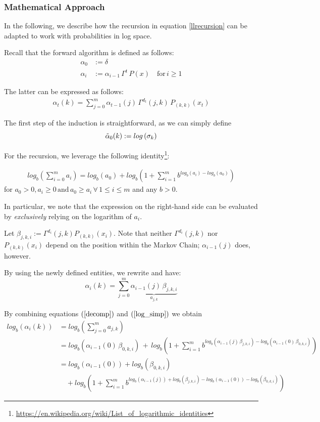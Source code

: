 \subsubsection{Mathematical Approach}
In the following, we describe how the recursion in equation \ref{llrecursion} can be adapted to work with probabilities in log space.  

Recall that the forward algorithm is defined as follows:
\begin{align*}
\alpha_0 &:= \delta \\
\alpha_i &:= \alpha_{i-1} \, \Gamma^t \, P(x) \quad \text{for}\, i \geq 1
\end{align*}

The latter can be expressed as follows:
\begin{align*}
\alpha_t(k) = \sum_{j=0}^m \alpha_{t-1}(j) \, \Gamma^{d_t}(j,k) \, P_{(k, k)}(x_t)
\end{align*}

The first step of the induction is straightforward, as we can simply define
\[
\tilde{\alpha}_{0}(k) := log\left(\sigma_k\right)
\]

For the recursion, we leverage the following identity\footnote{\url{https://en.wikipedia.org/wiki/List_of_logarithmic_identities}}:

\begin{align}
log_b\left( \sum_{i=0}^m a_i \right) = 
log_b(a_0) + log_b\left(1 + \sum_{i=1}^m b^{log_b(a_i) - log_b(a_0)}\right)
\label{log_simp}
\end{align}
for $a_0 > 0, a_i \geq 0 \, \text{and} \, a_0 \geq a_i \, \forall \, 1 \leq i \leq m$  and any $b > 0$.  

In particular, we note that the expression on the right-hand side can be evaluated by \textit{exclusively} relying on the logarithm of $a_i$. 

Let $ \beta_{j, k, i} := \Gamma^{d_i}(j,k) P_{(k, k)}(x_i)$. Note that neither $\Gamma^{d_i}(j,k)$ nor $ P_{(k, k)}(x_i)$ depend on the position within the Markov Chain; $\alpha_{i-1}(j)$ does, however. 

By using the newly defined entities, we rewrite and have:
\begin{equation}
\alpha_i(k) = \sum_{j=0}^m \underbrace{\alpha_{i-1}(j) \, \beta_{j, k, i}}_{a_{j, k}}
\label{decomp}
\end{equation}

By combining equations $(\ref{decomp})$ and $(\ref{log_simp})$ we obtain
\begin{align*}
log_b\left(\alpha_i(k)\right) 
&= log_b\left( \sum_{j=0}^m a_{j, k} \right) \\
&=
log_b \left( \alpha_{i-1}(0) \, \beta_{0, k, i} \right) 
\, + \, log_b \left(
1 + \sum_{i=1}^m b^{
	log_b(\alpha_{i-1}(j) \, \beta_{j, k, i})
	- log_b(\alpha_{i-1}(0) \, \beta_{0, k, i})
}
\right) \nonumber \\
&= log_b(\alpha_{i-1}(0)) + log_b(\beta_{0, k, i}) \\
& \quad + log_b \left(
1 + \sum_{i=1}^m b^{
	log_b(\alpha_{i-1}(j)) + log_b(\beta_{j, k, i})
	- log_b(\alpha_{i-1}(0)) - log_b(\beta_{0, k, i})
}
\right)
\end{align*}

